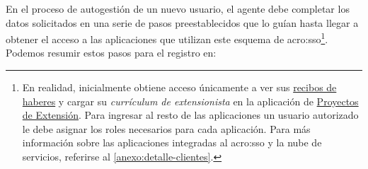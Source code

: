En el proceso de autogestión de un nuevo usuario, el agente debe completar los datos solicitados en una serie de pasos preestablecidos que lo guían hasta llegar a obtener el acceso a las aplicaciones que utilizan este esquema de \gls{acro:sso}\footnote{En realidad, inicialmente obtiene acceso únicamente a ver sus \hyperref[anexo:detalle-clientes:recibos]{recibos de haberes} y cargar su \textit{currículum de extensionista} en la aplicación de \hyperref[anexo:detalle-clientes:extension]{Proyectos de Extensión}. Para ingresar al resto de las aplicaciones un usuario autorizado le debe asignar los roles necesarios para cada aplicación. Para más información sobre las aplicaciones integradas al \gls{acro:sso} y la nube de servicios, referirse al \autoref{anexo:detalle-clientes}.}. Podemos resumir estos pasos para el registro en:

